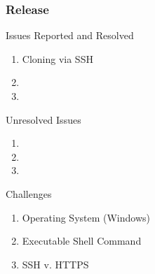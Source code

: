 \begin{frame}
	\centering
	\frametitle{Release}

	\begin{block}{Issues Reported and Resolved}				
		\begin{enumerate}
			\item Cloning via SSH
			\item 
			\item 		
		\end{enumerate}		
	\end{block}	
	
	\pause
	
	\begin{block}{Unresolved Issues}				
		\begin{enumerate}
			\item 
			\item 
			\item 		
		\end{enumerate}		
	\end{block}	

	\pause
	
	\begin{block}{Challenges}				
		\begin{enumerate}
      \item Operating System (Windows)
			\item Executable Shell Command
			\item SSH v. HTTPS
		\end{enumerate}		
	\end{block}
	
\end{frame}
